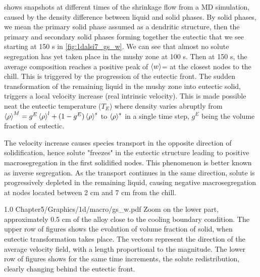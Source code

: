  shows snapshots at different times of the shrinkage flow from a MD simulation, caused by the density difference between liquid and solid phases.
By solid phases, we mean the primary solid phase assumed as a dendritic structure, then the primary and secondary solid phases forming together the eutectic
that we see starting at 150 s in \cref{fig:1dalsi7_gs_w}. 
We can see that almost no solute segregation has yet taken place in the mushy zone at 100 s.
Then at 150 s, the average composition reaches a positive peak of $\left \langle w \right \rangle$= at the closest nodes to the chill. 
This is triggered by the progression of the eutectic front.
The sudden transformation of the remaining liquid in the mushy zone into eutectic solid, triggers a local velocity increase (real intrinsic velocity).
This is made possible neat the eutectic temperature ($T_E$) where density varies abruptly from $\left \langle \rho \right \rangle^M=g^E \left \langle \rho \right \rangle^l + (1-g^E) \left \langle \rho \right \rangle^s$ to $\left \langle \rho \right \rangle^s$ 
in a single time step, $g^E$ being the volume fraction of eutectic. 

The velocity increase causes species transport in the opposite direction of solidification,
hence solute "freezes" in the eutectic structure leading to positive macrosegregation
in the first solidified nodes. This phenomenon is better known as inverse segregation. 
As the transport continues in the same direction, 
solute is progressively depleted in the remaining liquid, causing negative macrosegregation at nodes located between 2 cm and 7 cm from the chill.



\begin{figureth}
{1.0}
{Chapter5/Graphics/1d/macro/gs_w.pdf}
{Zoom on the lower part, approximately 0.5 cm of the alloy close to the cooling boundary condition. 
The upper row of figures shows the evolution of volume fraction of solid, when eutectic transformation takes place. 
The vectors represent the direction of the average velocity field, with a length proportional
to the magnitude. The lower row of figures shows for the same time increments, the solute redistribution, 
clearly changing behind the eutectic front.}
\label{fig:1dalsi7_gs_w}
\end{figureth}

